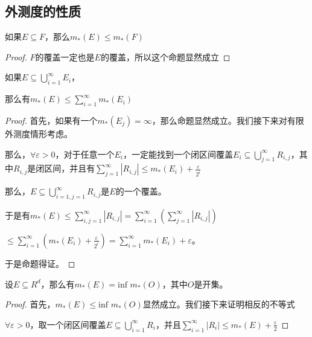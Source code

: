 \documentclass[12pt, a4paper, oneside, UTF8]{ctexbook}
\begin{document}
		\subsection{外测度的性质}
		\begin{para}{0}
				\begin{proposition}
					如果$E \subseteq F$，那么$m_*(E) \leqslant m_*(F)$
				\end{proposition}
				\begin{proof}
					$F$的覆盖一定也是$E$的覆盖，所以这个命题显然成立
				\end{proof}
				\begin{proposition}
					如果$E \subseteq \bigcup\limits_{i=1}^{\infty} E_i$，
					
					那么有$m_*(E) \leqslant \sum\limits_{i=1}^{\infty} m_*(E_i)$
				\end{proposition}
				\begin{proof}
					首先，如果有一个$m_*(E_j) = \infty$，那么命题显然成立。我们接下来对有限外测度情形考虑。
					
					那么，$\forall \varepsilon > 0$，对于任意一个$E_i$，一定能找到一个闭区间覆盖$E_i \subseteq \bigcup\limits_{j=1}^{\infty} R_{i,j}$，其中$R_{i,j}$是闭区间，并且有$\sum\limits_{j=1}^{\infty} |R_{i,j}| \leqslant m_*(E_i) + \frac{\varepsilon}{2^i}$
					
					那么，$E \subseteq \bigcup\limits_{i=1,j=1}^{\infty} R_{i,j}$是$E$的一个覆盖。
					
					于是有$m_*(E) \leqslant \sum\limits_{i,j=1}^{\infty} |R_{i,j}| = \sum\limits_{i=1}^{\infty} \left(\sum\limits_{j=1}^{\infty} |R_{i,j}|\right)$
					
					$\leqslant \sum\limits_{i=1}^{\infty} \left(m_*(E_i) + \frac{\varepsilon}{2^i}\right) = \sum\limits_{i=1}^{\infty} m_*(E_i) + \varepsilon$。
					
					于是命题得证。
				\end{proof}
			\point{}
				\begin{proposition}
					设$E \subseteq R^d$，那么有$m_*(E) = \text{inf }m_*(O)$，其中$O$是开集。
				\end{proposition}
				\begin{proof}
					首先，$m_*(E) \leqslant \text{inf }m_*(O)$显然成立。我们接下来证明相反的不等式
					
					$\forall \varepsilon > 0$，取一个闭区间覆盖$E \subseteq \bigcup\limits_{i=1}^{\infty} R_i$，并且$\sum\limits_{i=1}^{\infty} |R_i| \leqslant m_*(E) + \frac{\varepsilon}{2}$
					

\end{proof}
\end{para}
\end{document}
